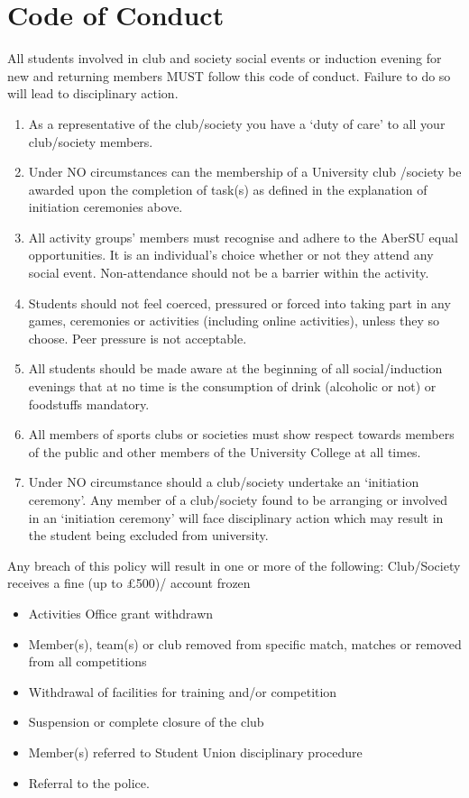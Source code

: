 \documentclass[a4paper,11pt]{article}
\begin{document}
\section{Code of Conduct}
All students involved in club and society social events or induction evening for new and returning members MUST follow this code of conduct. Failure to do so will lead to disciplinary action.
\begin{enumerate}[nolistsep]
  \item As a representative of the club/society you have a ‘duty of care’ to all your club/society members.
  \item Under NO circumstances can the membership of a University club /society be awarded upon the completion of task(s) as defined in the explanation of initiation ceremonies above.
  \item All activity groups’ members must recognise and adhere to the AberSU equal opportunities. It is an individual's choice whether or not they attend any social event.
Non-attendance should not be a barrier within the activity.
  \item Students should not feel coerced, pressured or forced into taking part in any games, ceremonies or activities (including online activities), unless they so choose. Peer pressure is not acceptable.
  \item All students should be made aware at the beginning of all social/induction evenings that at no time is the consumption of drink (alcoholic or not) or foodstuffs mandatory.
  \item All members of sports clubs or societies must show respect towards members of the public and other members of the University College at all times.
  \item Under NO circumstance should a club/society undertake an ‘initiation ceremony’. Any member of a club/society found to be arranging or involved in an ‘initiation ceremony’ will face disciplinary action which may result in the student being excluded from university.
\end{enumerate}

Any breach of this policy will result in one or more of the following:\newline
Club/Society receives a fine (up to £500)/ account frozen

\begin{itemize}[nolistsep]
  \item Activities Office grant withdrawn
  \item Member(s), team(s) or club removed from specific match, matches or removed from all competitions
  \item Withdrawal of facilities for training and/or competition
  \item Suspension or complete closure of the club
  \item Member(s) referred to Student Union disciplinary procedure
  \item Referral to the police.
\end{itemize}
\end{document}
